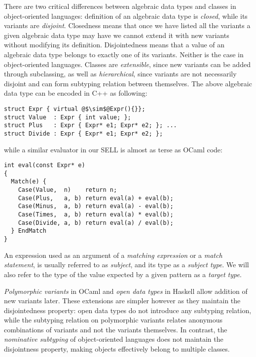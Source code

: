 \noindent
There are two critical differences between algebraic data types and classes in 
object-oriented languages: definition of an algebraic data type is \emph{closed}, 
while its variants are \emph{disjoint}. Closedness means that once we have listed 
all the variants a given algebraic data type may have we cannot extend it with 
new variants without modifying its definition. Disjointedness means that a value 
of an algebraic data type belongs to exactly one of its variants. Neither is 
the case in object-oriented languages. Classes are \emph{extensible},
since new variants can be added through subclassing, as well as 
\emph{hierarchical}, since variants are not necessarily disjoint and can form 
subtyping relation between themselves. The above algebraic data type can be 
encoded in C++ as following:

\begin{lstlisting}[columns=flexible]
struct Expr { virtual @$\sim$@Expr(){}};
struct Value  : Expr { int value; };
struct Plus   : Expr { Expr* e1; Expr* e2; }; ...
struct Divide : Expr { Expr* e1; Expr* e2; };
\end{lstlisting}

\noindent
while a similar evaluator in our SELL is almost as terse as OCaml code:

\begin{lstlisting}[columns=flexible]
int eval(const Expr* e)
{
  Match(e) {
    Case(Value,  n)    return n;
    Case(Plus,   a, b) return eval(a) + eval(b); 
    Case(Minus,  a, b) return eval(a) - eval(b);
    Case(Times,  a, b) return eval(a) * eval(b); 
    Case(Divide, a, b) return eval(a) / eval(b);
  } EndMatch
}
\end{lstlisting}

\noindent
An expression  used as an argument of a \emph{matching expression} or a 
\emph{match statement}, is usually referred to as \emph{subject}, and its type 
as a \emph{subject type}. We will also refer to the type of the value expected 
by a given pattern as a \emph{target type}.

\emph{Polymorphic variants} in OCaml\cite{garrigue-98} and \emph{open data 
types} in Haskell\cite{LohHinze2006} allow addition of new variants later. 
These extensions are simpler however as they maintain the 
disjointedness property: open data types do not introduce any subtyping relation, 
while the subtyping relation on polymorphic variants relates anonymous 
combinations of variants and not the variants themselves. In contrast, 
the \emph{nominative subtyping} of object-oriented languages does not maintain 
the disjointness property, making objects effectively belong to multiple classes. 

